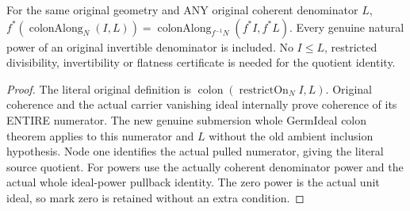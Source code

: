\begin{theorem}
\label{hir:submersion-relative-control-whole-colon-along}
\leanok
For the same original geometry and ANY original coherent denominator $L$,
$f^*(\operatorname{colonAlong}_N(I,L))=
 \operatorname{colonAlong}_{f^{-1}N}(f^*I,f^*L)$.
Every genuine natural power of an original invertible denominator is included.
No $I\le L$, restricted divisibility, invertibility or flatness certificate
is needed for the quotient identity.
\end{theorem}
\begin{proof}
The literal original definition is $\operatorname{colon}(
\operatorname{restrictOn}_N I,L)$. Original coherence and the actual carrier
vanishing ideal internally prove coherence of its ENTIRE numerator. The
new genuine submersion whole GermIdeal colon theorem applies to this
numerator and $L$ without the old ambient inclusion hypothesis. Node one
identifies the actual pulled numerator, giving the literal source quotient.
For powers use the actually coherent denominator power and the actual
whole ideal-power pullback identity. The zero power is the actual unit
ideal, so mark zero is retained without an extra condition.
\end{proof}

